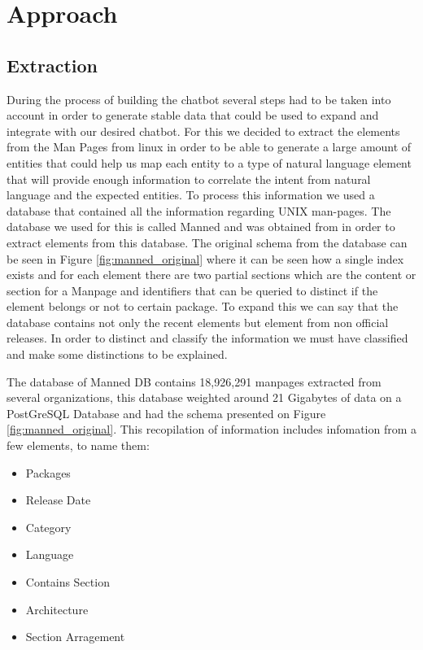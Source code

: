 \chapter{Approach}

\section{Extraction}
During the process of building the chatbot several steps had to be taken into account in order to generate stable data that could be used to expand and integrate with our desired chatbot. For this we decided to extract the elements from the Man Pages from linux in order to be able to generate a large amount of entities that could help us map each entity to a type of natural language element that will provide enough information to correlate the intent from natural language and the expected entities. To process this information we used a database that contained all the information regarding UNIX man-pages. The database we used for this is called Manned and was obtained from \cite{mannedDB} in order to extract elements from this database. The original schema from the database can be seen in Figure \ref{fig:manned_original} where it can be seen how a single index exists and for each element there are two partial sections which are the content or section for a Manpage and identifiers that can be queried to distinct if the element belongs or not to certain package. To expand this we can say that the database contains not only the recent elements but element from non official releases. In order to distinct and classify the information we must have classified and make some distinctions to be explained.

The database of Manned DB contains 18,926,291 manpages extracted from several organizations, this database weighted around 21 Gigabytes of data on a PostGreSQL Database and had the schema presented on Figure \ref{fig:manned_original}. This recopilation of information includes infomation from a few elements, to name them:
\begin{itemize}
    \item Packages
    \item Release Date
    \item Category
    \item Language
    \item Contains Section
    \item Architecture
    \item Section Arragement
\end{itemize}{}

